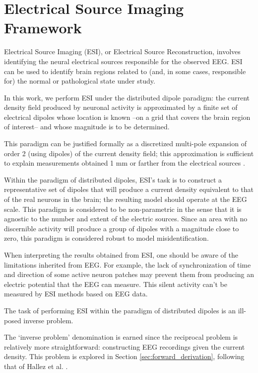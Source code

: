 \section{Electrical Source Imaging Framework}

Electrical Source Imaging (ESI), or Electrical Source Reconstruction, involves identifying the neural electrical sources responsible for the observed EEG.
%
ESI can be used to identify brain regions related to (and, in some cases, responsible for) the normal or pathological state under study.

%
In this work, we perform ESI under the distributed dipole paradigm: the current density field produced by neuronal activity is approximated by a finite set of electrical dipoles whose location is known --on a grid that covers the brain region of interest-- and whose magnitude is to be determined. 

This paradigm can be justified formally as a discretized multi-pole expansion of order 2 (using dipoles) of the current density field; this approximation is sufficient to explain measurements obtained 1 mm or farther from the electrical sources \cite{nunez2019multi}.

Within the paradigm of distributed dipoles, ESI's task is to construct a representative set of dipoles that will produce a current density equivalent to that of the real neurons in the brain; the resulting model should operate at the EEG scale.
%
This paradigm is considered to be non-parametric in the sense that it is agnostic to the number and extent of the electric sources. 
%
Since an area with no discernible activity will produce a group of dipoles with a magnitude close to zero, this paradigm is considered robust to model misidentification.

When interpreting the results obtained from ESI, one should be aware of the limitations inherited from EEG.
%
For example, the lack of synchronization of time and direction of some active neuron patches may prevent them from producing an electric potential that the EEG can measure.
%
This silent activity can't be measured by ESI methods based on EEG data.

The task of performing ESI within the paradigm of distributed dipoles is an ill-posed inverse problem.

The `inverse problem' denomination is earned since the reciprocal problem is relatively more straightforward: constructing EEG recordings given the current density.
%
This problem is explored in Section \ref{sec:forward_derivation}, following that of Hallez et al. \cite{hallez2007review}.

